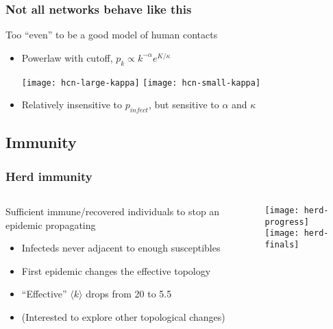 \documentclass{beamer}
\begin{document}
\begin{frame}
  \frametitle{Not all networks behave like this}

  \begin{block}{Too ``even'' to be a good model of human contacts}
    \begin{itemize}
    \item Powerlaw with cutoff, $p_k \propto k^{-\alpha} e^{K/\kappa}$

      \centering
      \hfill\texttt{[image: hcn-large-kappa]} \hfill
      \texttt{[image: hcn-small-kappa]} \hfill~
     
    \item Relatively insensitive to $p_{infect}$, but sensitive to
      $\alpha$ and $\kappa$ 
    \end{itemize}
  \end{block}

\end{frame}


\subsection{Immunity}

\begin{frame}
  \frametitle{Herd immunity}

  \begin{columns}
    \begin{column}[c]{.6\textwidth}
      \begin{block}{Sufficient immune/recovered individuals to stop an
          epidemic propagating}
        \begin{itemize}
        \item Infecteds never adjacent to enough susceptibles
        \item First epidemic changes the effective topology
        \item ``Effective'' $\langle k \rangle$ drops from 20 to 5.5
        \item (Interested to explore other topological changes)
        \end{itemize}    
      \end{block}
    \end{column}
    \begin{column}[c]{.4\textwidth}
      \texttt{[image: herd-progress]}
      \\[.5cm]
      \texttt{[image: herd-finals]}
    \end{column}
  \end{columns}
\end{frame}
\end{document}
